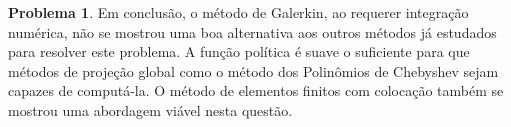 \documentclass[11pt]{article}
\theoremstyle{definition}
\newtheorem{prob}{Problema}
\theoremstyle{solution}
\begin{document}
\begin{prob}
	Em conclusão, o método de Galerkin, ao requerer integração numérica, não se mostrou uma boa alternativa aos outros métodos já estudados para resolver este problema. A função política é suave o suficiente para que métodos de projeção global como o método dos Polinômios de Chebyshev sejam capazes de computá-la. O método de elementos finitos com colocação também se mostrou uma abordagem viável nesta questão.
\end{prob}
\end{document}

